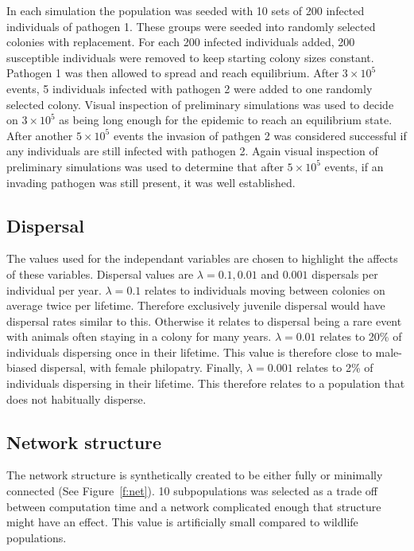 In each simulation the population was seeded with 10 sets of 200 infected individuals of pathogen 1.
These groups were seeded into randomly selected colonies with replacement.
For each 200 infected individuals added, 200 susceptible individuals were removed to keep starting colony sizes constant. 
Pathogen 1 was then allowed to spread and reach equilibrium. 
After \ensuremath{3\times 10^{5}} events, 5 individuals infected with pathogen 2 were added to one randomly selected colony. 
Visual inspection of preliminary simulations was used to decide on \ensuremath{3\times 10^{5}} as being long enough for the epidemic to reach an equilibrium state.
After another \ensuremath{5\times 10^{5}} events the invasion of pathgen 2 was considered successful if any individuals are still infected with pathogen 2.
Again visual inspection of preliminary simulations was used to determine that after \ensuremath{5\times 10^{5}} events, if an invading pathogen was still present, it was well established. 


\subsection{Dispersal}

The values used for the independant variables are chosen to highlight the affects of these variables. 
Dispersal values are $\lambda = 0.1, 0.01$ and $ 0.001$ dispersals per individual per year. 
$\lambda = 0.1$ relates to individuals moving between colonies on average twice per lifetime. 
Therefore exclusively juvenile dispersal would have dispersal rates similar to this. 
Otherwise it relates to dispersal being a rare event with animals often staying in a colony for many years.
$\lambda = 0.01$ relates to 20\% of individuals dispersing once in their lifetime.
This value is therefore close to male-biased dispersal, with female philopatry. 
Finally, $\lambda = 0.001$ relates to 2\% of individuals dispersing in their lifetime.
This therefore relates to a population that does not habitually disperse.




\subsection{Network structure}
The network structure is synthetically created to be either fully or minimally connected (See Figure~\ref{f:net}). 
10 subpopulations was selected as a trade off between computation time and a network complicated enough that structure might have an effect. 
This value is artificially small compared to wildlife populations. 



